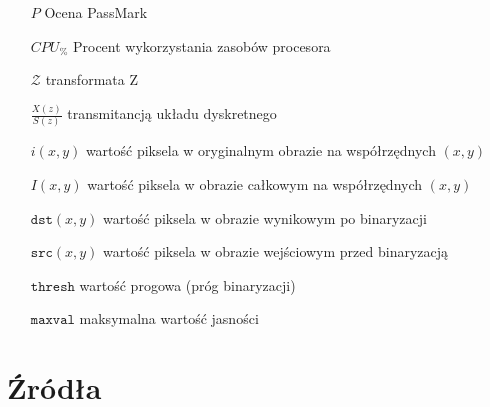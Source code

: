 \documentclass[a4paper,twoside,12pt]{book}
\begin{document}
\begin{appendices}
\begin{itemize}
\item[$P$] Ocena PassMark 
\item[$CPU_{\%}$] Procent wykorzystania zasobów procesora
\item[$\mathcal{Z}$] transformata Z
\item[$\frac{X(z)}{S(z)}$] transmitancją układu dyskretnego
\item[$i(x,y)$] wartość piksela w oryginalnym obrazie na współrzędnych $(x,y)$
\item[$I(x,y)$] wartość piksela w obrazie całkowym na współrzędnych $(x,y)$
\item[$\texttt{dst}(x,y)$] wartość piksela w obrazie wynikowym po binaryzacji
\item[$\texttt{src}(x,y)$] wartość piksela w obrazie wejściowym przed binaryzacją
\item[$\texttt{thresh}$] wartość progowa (próg binaryzacji)
\item[$\texttt{maxval}$] maksymalna wartość jasności

\end{itemize}


%
%
%
\chapter{Źródła}





%
%
%

\end{appendices}
\end{document}
